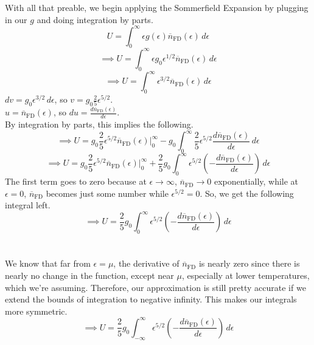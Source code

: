 \documentclass[12pt]{article}
\begin{document}
\begin{flushleft}
With all that preable, we begin applying the Sommerfield Expansion by plugging in our $g$ and doing integration by parts.
$$U=\int_0^\infty\epsilon g(\epsilon)\overline{n}_\text{FD}(\epsilon)\,d\epsilon$$
$$\implies U=\int_0^\infty\epsilon g_0\epsilon^{1/2}\overline{n}_\text{FD}(\epsilon)\,d\epsilon$$
$$\implies U=\int_0^\infty\epsilon^{3/2}\overline{n}_\text{FD}(\epsilon)\,d\epsilon$$
$dv=g_0\epsilon^{3/2}\,d\epsilon$, so $v=g_0\frac{2}{5}\epsilon^{5/2}$.\\
$u=\overline{n}_\text{FD}(\epsilon)$, so $du=\frac{d\overline{n}_\text{FD}(\epsilon)}{d\epsilon}$.\\
By integration by parts, this implies the following.
$$\implies U=g_0\frac{2}{5}\epsilon^{5/2}\overline{n}_\text{FD}(\epsilon)\Big|_0^\infty-g_0\int_0^\infty\frac{2}{5}\epsilon^{5/2}\frac{d\overline{n}_\text{FD}(\epsilon)}{d\epsilon}\,d\epsilon$$
$$\implies U=g_0\frac{2}{5}\epsilon^{5/2}\overline{n}_\text{FD}(\epsilon)\Big|_0^\infty+\frac{2}{5}g_0\int_0^\infty\epsilon^{5/2}\left(-\frac{d\overline{n}_\text{FD}(\epsilon)}{d\epsilon}\right)\,d\epsilon$$
The first term goes to zero because at $\epsilon\rightarrow\infty$, $\overline{n}_\text{FD}\rightarrow0$ exponentially, while at $\epsilon=0$, $\overline{n}_\text{FD}$ becomes just some number while $\epsilon^{5/2}=0$.
So, we get the following integral left.
$$\implies U=\frac{2}{5}g_0\int_0^\infty\epsilon^{5/2}\left(-\frac{d\overline{n}_\text{FD}(\epsilon)}{d\epsilon}\right)\,d\epsilon$$\\~\\

We know that far from $\epsilon=\mu$, the derivative of $\overline{n}_\text{FD}$ is nearly zero since there is nearly no change in the function, except near $\mu$, especially at lower temperatures, which we're assuming.
Therefore, our approximation is still pretty accurate if we extend the bounds of integration to negative infinity.
This makes our integrals more symmetric.
$$\implies U=\frac{2}{5}g_0\int_{-\infty}^\infty\epsilon^{5/2}\left(-\frac{d\overline{n}_\text{FD}(\epsilon)}{d\epsilon}\right)\,d\epsilon$$\\~\\


\end{flushleft}
\end{document}
